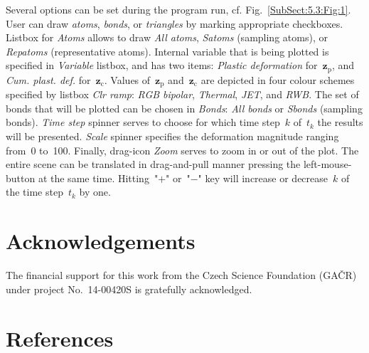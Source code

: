 \documentclass[preprint,12pt,authoryear]{elsarticle}
\newcommand{\bs}[1]{{\boldsymbol{#1}}}
\begin{document}
Several options can be set during the program run, cf. Fig.~\ref{SubSect:5.3:Fig:1}. User can draw \emph{atoms}, \emph{bonds}, or \emph{triangles} by marking appropriate checkboxes. Listbox for \emph{Atoms} allows to draw \emph{All atoms}, \emph{Satoms} (sampling atoms), or \emph{Repatoms} (representative atoms). Internal variable that is being plotted is specified in \emph{Variable} listbox, and has two items: \emph{Plastic deformation} for~$\bs{z}_\mathrm{p}$, and \emph{Cum. plast. def.} for~$\bs{z}_\mathrm{c}$. Values of~$\bs{z}_\mathrm{p}$ and~$\bs{z}_\mathrm{c}$ are depicted in four colour schemes specified by listbox \emph{Clr ramp}: \emph{RGB bipolar}, \emph{Thermal}, \emph{JET}, and \emph{RWB}. The set of bonds that will be plotted can be chosen in \emph{Bonds}: \emph{All bonds} or \emph{Sbonds} (sampling bonds). \emph{Time step} spinner serves to choose for which time step~$k$ of~$t_k$ the results will be presented. \emph{Scale} spinner specifies the deformation magnitude ranging from~0 to~100. Finally, drag-icon \emph{Zoom} serves to zoom in or out of the plot. The entire scene can be translated in drag-and-pull manner pressing the left-mouse-button at the same time. Hitting~"$+$" or~"$-$" key will increase or decrease~$k$ of the time step~$t_k$ by one.
%
%
%
%
%
%
%
\section*{Acknowledgements}
%
The financial support for this work from the Czech Science Foundation (GA\v{C}R) under project No.~14-00420S is gratefully acknowledged.
%
%
\section*{References}
%



\end{document}
